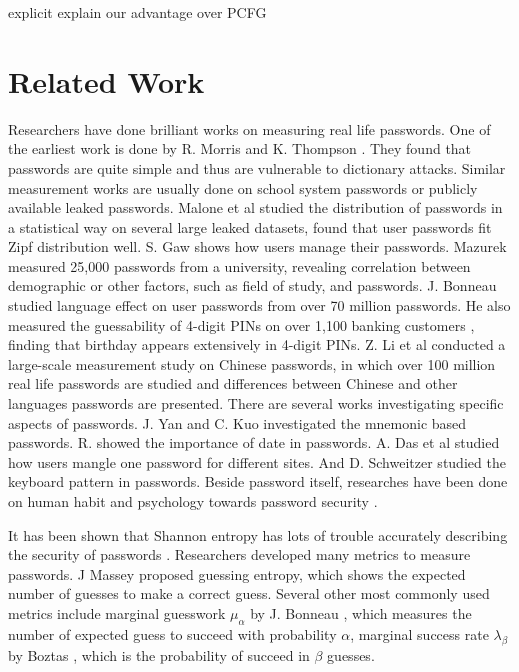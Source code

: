 \documentclass{sig-alternate}
\begin{document}
explicit explain our advantage over PCFG

\section{Related Work}

Researchers have done brilliant works on measuring real life passwords. One of the earliest work is done by R. Morris and K. Thompson \cite{morris1979password}. They found that passwords are quite simple and thus are vulnerable to dictionary attacks. Similar measurement works are usually done on school system passwords or publicly available leaked passwords. Malone et al \cite{malone2012investigating} studied the distribution of passwords in a statistical way on several large leaked datasets, found that user passwords fit Zipf distribution well. S. Gaw \cite{gaw2006password} shows how users manage their passwords. Mazurek \cite{mazurek2013measuring} measured 25,000 passwords from a university, revealing correlation between demographic or other factors, such as field of study, and passwords.   J. Bonneau \cite{bonneau2012science} studied language effect on user passwords from over 70 million passwords. He also measured the guessability of 4-digit PINs on over 1,100 banking customers \cite{bonneau2012birthday}, finding that birthday appears extensively in 4-digit PINs. Z. Li et al \cite{li2014large} conducted a large-scale measurement study on Chinese passwords, in which over 100 million real life passwords are studied and differences between Chinese and other languages passwords are presented. There are several works investigating specific aspects of passwords. J. Yan \cite{yan2004password} and C. Kuo \cite{kuo2006human} investigated the mnemonic based passwords. R.  \cite{veras2012visualizing} showed the importance of date in passwords. A. Das et al \cite{das2014tangled} studied how users mangle one password for different sites. And D. Schweitzer \cite{schweitzer2009visualizing} studied the keyboard pattern in passwords.  Beside password itself, researches have been done on human habit and psychology towards password security \cite{florencio2007large}\cite{howe2012psychology}. 

It has been shown that Shannon entropy has lots of trouble accurately describing the security of passwords \cite{cachin1997entropy}\cite{kelley2012guess}\cite{pliam2000incomparability}\cite{weir2010testing}. Researchers developed many metrics to measure passwords. J Massey \cite{massey1994guessing} proposed guessing entropy, which shows the expected number of guesses to make a correct guess. Several other most commonly used metrics include marginal guesswork $\mu_\alpha$ by J. Bonneau \cite{pliam2000incomparability}, which measures the number of expected guess to succeed with probability $\alpha$,  marginal success rate $\lambda_\beta$ by Boztas \cite{boztas1999entropies}, which is the probability of succeed in $\beta$ guesses.
\end{document}
